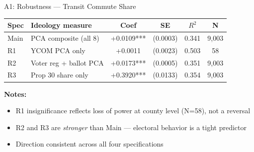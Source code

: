 \documentclass[aspectratio=169,t]{beamer}
\begin{document}

\begin{frame}{A1: Robustness --- Transit Commute Share}
  \begin{center}
  \begin{tabular}{llcccc}
    \toprule
    \textbf{Spec} & \textbf{Ideology measure} & \textbf{Coef} & \textbf{SE} & \textbf{$R^2$} & \textbf{N} \\
    \midrule
    Main & PCA composite (all 8)  & +0.0109*** & (0.0003) & 0.341 & 9,003 \\
    R1   & YCOM PCA only          & +0.0011    & (0.0023) & 0.503 & 58 \\
    R2   & Voter reg + ballot PCA & +0.0173*** & (0.0005) & 0.351 & 9,003 \\
    R3   & Prop 30 share only     & +0.3920*** & (0.0133) & 0.354 & 9,003 \\
    \bottomrule
  \end{tabular}
  \end{center}

  \vspace{0.4em}
  \textbf{Notes:}
  \begin{itemize}
    \item R1 insignificance reflects loss of power at county level (N=58), not a reversal
    \item R2 and R3 are \textit{stronger} than Main --- electoral behavior is a tight predictor
    \item Direction consistent across all four specifications
  \end{itemize}
\end{frame}
\end{document}
